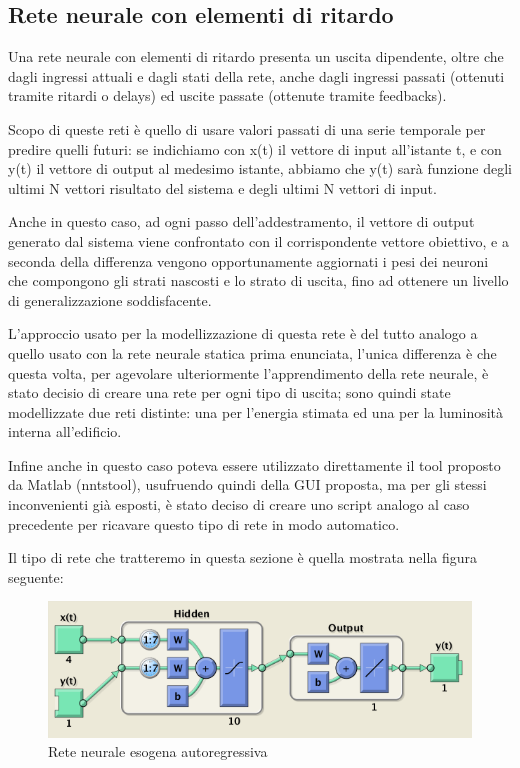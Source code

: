 \subsection{Rete neurale con elementi di ritardo}

Una rete neurale con elementi di ritardo presenta un uscita dipendente, oltre che dagli ingressi attuali e dagli stati della rete, anche dagli ingressi passati (ottenuti tramite ritardi o delays) ed uscite passate (ottenute tramite feedbacks).

Scopo di queste reti è quello di usare valori passati di una serie temporale per predire quelli futuri: se indichiamo con x(t) il vettore di input all’istante t, e con y(t) il vettore di output al medesimo istante, abbiamo che y(t) sarà funzione degli ultimi N vettori risultato del sistema e degli ultimi N vettori di input.


Anche in questo caso, ad ogni passo dell'addestramento, il vettore di output generato dal sistema viene confrontato con il corrispondente vettore obiettivo, e a seconda della differenza vengono opportunamente aggiornati i pesi dei neuroni che compongono gli strati nascosti e lo strato di uscita, fino ad ottenere un livello di generalizzazione soddisfacente.

L'approccio usato per la modellizzazione di questa rete è del tutto analogo a quello usato con la rete neurale statica prima enunciata, l'unica differenza è che questa volta, per agevolare ulteriormente l'apprendimento della rete neurale, è stato decisio di creare una rete per ogni tipo di uscita; sono quindi state modellizzate due reti distinte: una per l'energia stimata ed una per la luminosità interna all'edificio.

Infine anche in questo caso poteva essere utilizzato direttamente il tool proposto da Matlab (nntstool), usufruendo quindi della GUI proposta, ma per gli stessi inconvenienti già esposti, è stato deciso di creare uno script analogo al caso precedente per ricavare questo tipo di rete in modo automatico.

Il tipo di rete che tratteremo in questa sezione è quella mostrata nella figura seguente:

\begin{figure}[htbp]
  \centering
  \includegraphics[scale=0.5]{images/timeseries/energia/net.png}
  \caption{Rete neurale esogena autoregressiva}
\end{figure}


